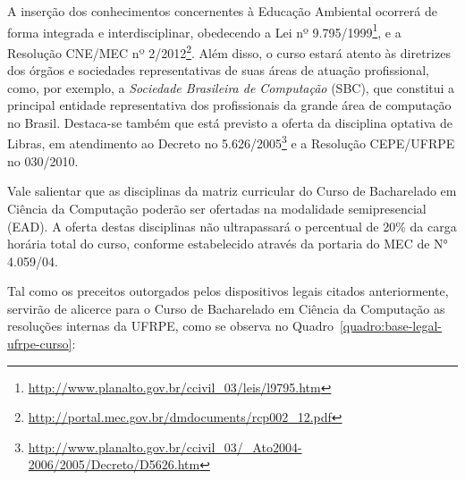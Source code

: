 \documentclass[
	12pt,				%
	openright,			%
  oneside,     %
	a4paper,			%
	chapter=TITLE,		%
	english,			%
	french,				%
	spanish,			%
	brazil				%
	]{abntex2}
\begin{document}
A inserção dos conhecimentos concernentes à Educação Ambiental ocorrerá de forma integrada e interdisciplinar, obedecendo a Lei nº 9.795/1999\footnote{\url{http://www.planalto.gov.br/ccivil_03/leis/l9795.htm}}, e a Resolução CNE/MEC nº 2/2012\footnote{\url{http://portal.mec.gov.br/dmdocuments/rcp002_12.pdf}}. Além disso, o curso estará atento às diretrizes dos órgãos e sociedades representativas de suas áreas de atuação profissional, como, por exemplo, a \textit{Sociedade Brasileira de Computação} (SBC), que constitui a principal entidade representativa dos profissionais da grande área de computação no Brasil. Destaca-se também que está previsto a oferta da disciplina optativa de Libras, em atendimento ao Decreto no 5.626/2005\footnote{\url{http://www.planalto.gov.br/ccivil_03/_Ato2004-2006/2005/Decreto/D5626.htm}} e a Resolução CEPE/UFRPE no 030/2010.

Vale salientar que as disciplinas da matriz curricular do Curso de Bacharelado em Ciência da Computação poderão ser ofertadas na modalidade semipresencial (EAD). A oferta destas disciplinas não ultrapassará o percentual de 20\% da carga horária total do curso, conforme estabelecido através da portaria do MEC de N° 4.059/04.

Tal como os preceitos outorgados pelos dispositivos legais citados anteriormente, servirão de alicerce para o Curso de Bacharelado em Ciência da Computação as resoluções internas da UFRPE, como se observa no Quadro~\ref*{quadro:base-legal-ufrpe-curso}:
\end{document}
